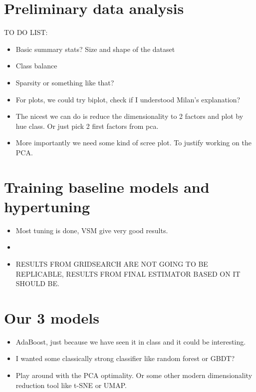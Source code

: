 \documentclass{article}
\begin{document}
\section{Preliminary data analysis}

TO DO LIST:
\begin{itemize}
    \item Basic summary stats? Size and shape of the dataset
    \item Class balance
    \item Sparsity or something like that?
    \item For plots, we could try biplot, check if I understood Milan's explanation?
    \item The nicest we can do is reduce the dimensionality to 2 factors and plot by hue class. 
    Or just pick 2 first factors from pca.
    \item More importantly we need some kind of scree plot. To justify working on the PCA.
\end{itemize}


\section{Training baseline models and hypertuning}

\begin{itemize}
    \item Most tuning is done, VSM give very good results.
    \item 
    \item RESULTS FROM GRIDSEARCH ARE NOT GOING TO BE REPLICABLE, RESULTS FROM FINAL ESTIMATOR BASED ON IT SHOULD BE.
\end{itemize}


\section{Our 3 models}

\begin{itemize}
    \item AdaBoost, just because we have seen it in class and it could be interesting.
    \item I wanted some classically strong classifier like random forest or GBDT?
    \item Play around with the PCA optimality. Or some other modern dimensionality reduction tool like t-SNE or UMAP. 
\end{itemize}

\section{}
\end{document}
